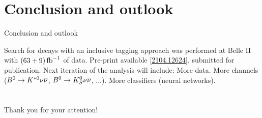 \section{Conclusion and outlook}
\begin{frame}{Conclusion and outlook}
\bi
\item Search for \BKnn decays with an inclusive tagging approach was performed at Belle II with $(63+9)\mbox{\,fb}^{-1}$ of data.
\itemi Pre-print available \href{https://arxiv.org/abs/2104.12624}{\color{blue!40!gray} [2104.12624]}, submitted for publication.
\itemi Next iteration of the analysis will include:
\bi
\itemii More data.
\itemii More channels ($B^0\rightarrow K^{*0}\nu\overline{\nu}$, $B^0\rightarrow K^0_S\nu\overline{\nu}$, ...).
\itemii More classifiers (neural networks).
\ei	
\ei
\end{frame}
\section*{}
\begin{frame}{}
\centering
{\Large Thank you for your attention!}\\ 


\end{frame}
